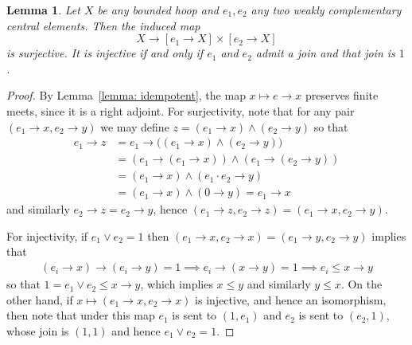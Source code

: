 \documentclass[10pt,a4paper]{amsart}
\newtheorem{lemma}{Lemma}
\begin{document}
\begin{lemma} \label{lemma: weakly complementary central}
Let $X$ be any bounded hoop and $e_1, e_2$ any two weakly complementary central elements. Then the induced map 
\[
X \to [e_1 \to X] \times [e_2 \to X]
\]
is surjective. It is injective if and only if $e_1$ and $e_2$ admit a join and that join is $1$.
\end{lemma}

\begin{proof}
By Lemma~\ref{lemma: idempotent}, the map $x \mapsto e\to x$ preserves finite meets, since it is a right adjoint.
For surjectivity, note that for any pair $(e_1 \to x, e_2 \to y)$ we may define $z = (e_1 \to x) \wedge (e_2 \to y)$ so that 
\begin{align*}
    e_1 \to z &= e_1 \to \big ((e_1 \to x) \wedge (e_2 \to y)\big) \\ 
    &= (e_1 \to (e_1 \to x))\wedge (e_1 \to (e_2 \to y)) \\
    &= (e_1 \to x) \wedge (e_1\cdot e_2 \to y) \\
    &= (e_1 \to x) \wedge (0 \to y) = e_1 \to x
\end{align*}
and similarly $e_2 \to z = e_2 \to y$, hence $(e_1 \to z, e_2 \to z) = (e_1 \to x, e_2 \to y)$. 

For injectivity, if $e_1 \vee e_2 = 1$ then $(e_1 \to x, e_2 \to x) = (e_1 \to y, e_2 \to y)$ implies that 
\begin{align*}
(e_i \to x) \to (e_i \to y) = 1 \implies e_i \to (x \to y) = 1 \implies e_i \leqslant x \to y
\end{align*}
so that $1 = e_1 \vee e_2 \leqslant x \to y$, which implies $x \leqslant y$ and similarly $y \leqslant x$. On the other hand, if $x \mapsto (e_1 \to x, e_2 \to x)$ is injective, and hence an isomorphism, then note that under this map $e_1$ is sent to $(1, e_1)$ and $e_2$ is sent to $(e_2, 1)$, whose join is $(1,1)$ and hence $e_1 \vee e_2 = 1$. 
\end{proof}
\end{document}
